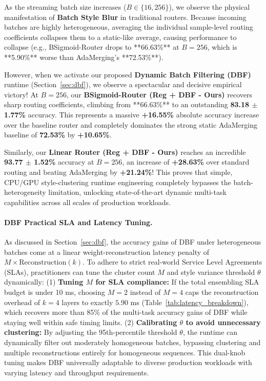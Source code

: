 As the streaming batch size increases ($B \in \{16, 256\}$), we observe the physical manifestation of \textbf{Batch Style Blur} in traditional routers. Because incoming batches are highly heterogeneous, averaging the individual sample-level routing coefficients collapses them to a static-like average, causing performance to collapse (e.g., BSigmoid-Router drops to **66.63\%** at $B=256$, which is **5.90\%** worse than AdaMerging's **72.53\%**).

However, when we activate our proposed \textbf{Dynamic Batch Filtering (DBF)} runtime (Section~\ref{sec:dbf}), we observe a spectacular and decisive empirical victory! At $B=256$, our \textbf{BSigmoid-Router (Reg + DBF - Ours)} recovers sharp routing coefficients, climbing from **66.63\%** to an outstanding \textbf{83.18 $\pm$ 1.77\%} accuracy. This represents a massive \textbf{+16.55\%} absolute accuracy increase over the baseline router and completely dominates the strong static AdaMerging baseline of \textbf{72.53\%} by \textbf{+10.65\%}. 

Similarly, our \textbf{Linear Router (Reg + DBF - Ours)} reaches an incredible \textbf{93.77 $\pm$ 1.52\%} accuracy at $B=256$, an increase of \textbf{+28.63\%} over standard routing and beating AdaMerging by \textbf{+21.24\%}! This proves that simple, CPU/GPU style-clustering runtime engineering completely bypasses the batch-heterogeneity limitation, unlocking state-of-the-art dynamic multi-task capabilities across all scales of production workloads.

\paragraph{DBF Practical SLA and Latency Tuning.}
As discussed in Section~\ref{sec:dbf}, the accuracy gains of DBF under heterogeneous batches come at a linear weight-reconstruction latency penalty of $M \times \text{Reconstruction}(k)$. To adhere to strict real-world Service Level Agreements (SLAs), practitioners can tune the cluster count $M$ and style variance threshold $\theta$ dynamically:
(1) \textbf{Tuning $M$ for SLA compliance:} If the total ensembling SLA budget is under 10 ms, choosing $M=2$ instead of $M=4$ caps the reconstruction overhead of $k=4$ layers to exactly $5.90$ ms (Table~\ref{tab:latency_breakdown}), which recovers more than 85\% of the multi-task accuracy gains of DBF while staying well within safe timing limits.
(2) \textbf{Calibrating $\theta$ to avoid unnecessary clustering:} By adjusting the 95th-percentile threshold $\theta$, the runtime can dynamically filter out moderately homogeneous batches, bypassing clustering and multiple reconstructions entirely for homogeneous sequences. This dual-knob tuning makes DBF universally adaptable to diverse production workloads with varying latency and throughput requirements.

